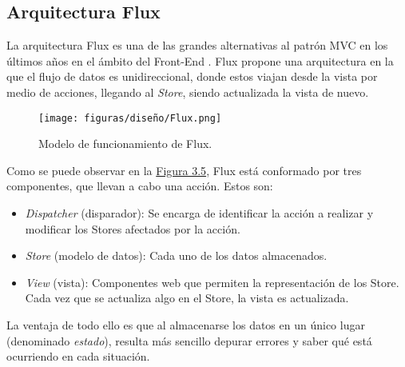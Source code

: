 \subsection{Arquitectura Flux}

La arquitectura Flux \cite{flux} es una de las grandes alternativas al patrón MVC \cite{mvc} en los últimos años en el ámbito del Front-End \cite{frontend}. Flux propone una arquitectura en la que el flujo de datos es unidireccional, donde estos viajan desde la vista por medio de acciones, llegando al {\it Store}, siendo actualizada la vista de nuevo.

\begin{figure}[H]
\centerline{\texttt{[image: figuras/diseño/Flux.png]}}
\caption{Modelo de funcionamiento de Flux.}
\label{enlaceImagenFlux}
\end{figure}

Como se puede observar en la \hyperref[enlaceImagenFlux]{Figura 3.5}, Flux está conformado por tres componentes, que llevan a cabo una acción. Estos son:
\begin{itemize}
    \item {\it Dispatcher} (disparador): Se encarga de identificar la acción a realizar y modificar los Stores afectados por la acción.
    \item {\it Store} (modelo de datos): Cada uno de los datos almacenados.
    \item {\it View} (vista): Componentes web que permiten la representación de los Store. Cada vez que se actualiza algo en el Store, la vista es actualizada.
\end{itemize}

La ventaja de todo ello es que al almacenarse los datos en un único lugar (denominado {\it estado}), resulta más sencillo depurar errores y saber qué está ocurriendo en cada situación.